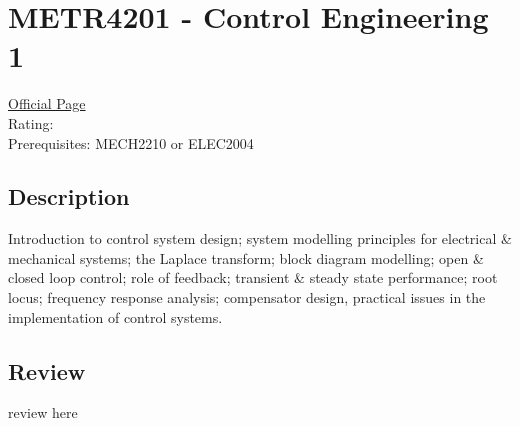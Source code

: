 \hypertarget{METR4201}{\section{METR4201 - Control Engineering 1}}

\large
\textcolor{turbo_purple}{\href{https://my.uq.edu.au/programs-courses/course.html?course_code=METR4201}{Official Page}} \\
Rating: \cstar\cstar\cstar\cstar\ostar \\
Prerequisites: MECH2210 or ELEC2004

\normalsize
\subsection*{Description}
Introduction to control system design; system modelling principles for electrical \& mechanical systems; the Laplace transform; block diagram modelling; open \& closed loop control; role of feedback; transient \& steady state performance; root locus; frequency response analysis; compensator design, practical issues in the implementation of control systems.

\subsection*{Review}
review here
